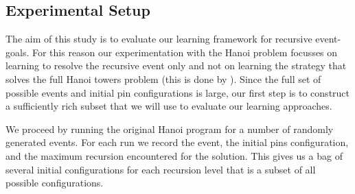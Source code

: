
\subsection{Experimental Setup} \label{sec:setup}

The aim of this study is to evaluate our learning framework for recursive event-goals. For this reason our experimentation with the Hanoi problem focusses on learning to resolve the recursive event  only and not on learning the strategy that solves the full Hanoi towers problem (this is done by ). Since the full set of possible  events and initial pin configurations is large, our first step is to construct a sufficiently rich subset that we will use to evaluate our learning approaches. 

We proceed by running the original Hanoi program for a number of randomly generated  events. For each run we record the  event, the initial pins configuration, and the maximum recursion encountered for the solution. This gives us a bag of several initial configurations for each recursion level that is a subset of all possible configurations. 

